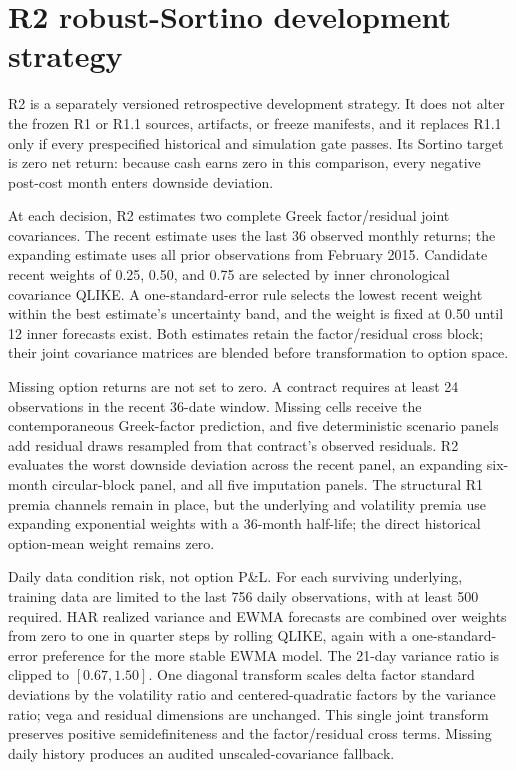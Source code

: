 \clearpage
\section{R2 robust-Sortino development strategy}
\label{sec:r2_update}

R2 is a separately versioned retrospective development strategy. It does not alter the
frozen R1 or R1.1 sources, artifacts, or freeze manifests, and it replaces R1.1 only if
every prespecified historical and simulation gate passes. Its Sortino target is zero net
return: because cash earns zero in this comparison, every negative post-cost month enters
downside deviation.

At each decision, R2 estimates two complete Greek factor/residual joint covariances. The
recent estimate uses the last 36 observed monthly returns; the expanding estimate uses all
prior observations from February 2015. Candidate recent weights of 0.25, 0.50, and 0.75
are selected by inner chronological covariance QLIKE. A one-standard-error rule selects
the lowest recent weight within the best estimate's uncertainty band, and the weight is
fixed at 0.50 until 12 inner forecasts exist. Both estimates retain the factor/residual
cross block; their joint covariance matrices are blended before transformation to option
space.

Missing option returns are not set to zero. A contract requires at least 24 observations
in the recent 36-date window. Missing cells receive the contemporaneous Greek-factor
prediction, and five deterministic scenario panels add residual draws resampled from that
contract's observed residuals. R2 evaluates the worst downside deviation across the recent
panel, an expanding six-month circular-block panel, and all five imputation panels. The
structural R1 premia channels remain in place, but the underlying and volatility premia use
expanding exponential weights with a 36-month half-life; the direct historical option-mean
weight remains zero.

Daily data condition risk, not option P\&L. For each surviving underlying, training data
are limited to the last 756 daily observations, with at least 500 required. HAR realized
variance and EWMA forecasts are combined over weights from zero to one in quarter steps by
rolling QLIKE, again with a one-standard-error preference for the more stable EWMA model.
The 21-day variance ratio is clipped to $[0.67,1.50]$. One diagonal transform scales delta
factor standard deviations by the volatility ratio and centered-quadratic factors by the
variance ratio; vega and residual dimensions are unchanged. This single joint transform
preserves positive semidefiniteness and the factor/residual cross terms. Missing daily
history produces an audited unscaled-covariance fallback.

